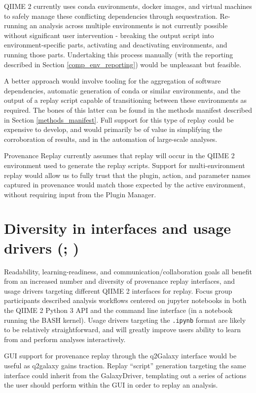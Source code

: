 QIIME 2 currently uses conda environments, docker images, and virtual machines
to safely manage these conflicting dependencies through sequestration.
Re-running an analysis across multiple environments is not currently possible
without significant user intervention - breaking the output script into
environment-specific parts, activating and deactivating environments, and
running those parts. Undertaking this process manually (with the reporting
described in Section \ref{comp_env_reporting}) would be unpleasant but feasible.

A better approach would involve tooling for the aggregation of software
dependencies, automatic generation of conda or similar environments, and the
output of a replay script capable of transitioning between these environments as
required. The bones of this latter can be found in the methods manifest
described in Section \ref{methods_manifest}. Full support for this type of
replay could be expensive to develop, and would primarily be of value in
simplifying the corroboration of results, and in the automation of large-scale
analyses. 

Provenance Replay currently assumes that replay will occur in the QIIME 2
environment used to generate the replay scripts. Support for multi-environment
replay would allow us to fully trust that the plugin, action, and parameter
names captured in provenance would match those expected by the active
environment, without requiring input from the Plugin Manager.

\section{Diversity in interfaces and usage drivers (\cite[Issue 65]{keefe_issues_2021}; \cite[Issue 79]{keefe_issues_2021})}

Readability, learning-readiness, and communication/collaboration goals all
benefit from an increased number and diversity of provenance replay interfaces,
and usage drivers targeting different QIIME 2 interfaces for replay. Focus group
participants described analysis workflows centered on jupyter notebooks in both
the QIIME 2 Python 3 API and the command line interface (in a notebook running
the BASH kernel). Usage drivers targeting the \texttt{.ipynb} format are likely to be
relatively straightforward, and will greatly improve users ability to learn from
and perform analyses interactively.

GUI support for provenance replay through the q2Galaxy interface would be useful
as q2galaxy gains traction. Replay “script” generation targeting the same
interface could inherit from the GalaxyDriver, templating out a series of
actions the user should perform within the GUI in order to replay an analysis.


